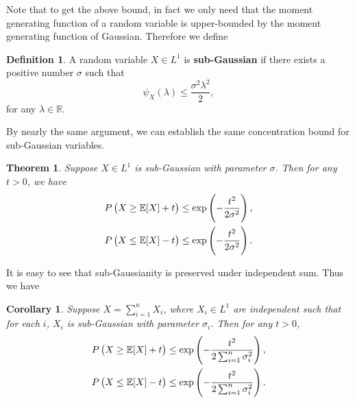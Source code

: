 \documentclass[openany]{book}
\newtheorem{corollary}{Corollary}[chapter]
\newtheorem{theorem}{Theorem}[chapter]
\theoremstyle{definition}
\newtheorem{definition}{Definition}[chapter]
\theoremstyle{remark}
\begin{document}
Note that to get the above bound, in fact we only need that the moment generating function of a random variable is upper-bounded by the moment generating function of Gaussian. Therefore we define
\begin{definition}\label{def:subGaussian}
    A random variable $X\in L^1$ is \textbf{sub-Gaussian} if there exists a positive number $\sigma$ such that
    \begin{equation*}
        \psi_X(\lambda)\le \frac{\sigma^2\lambda^2}{2},
    \end{equation*}
    for any $\lambda\in \mathbb{R}$.
\end{definition}
By nearly the same argument, we can establish the same concentration bound for sub-Gaussian variables.
\begin{theorem}
    Suppose $X\in L^1$ is sub-Gaussian with parameter $\sigma$. Then for any $t>0$, we have
    \begin{align*}
        P\del{X\ge \mathbb{E}[X]+t} & \le\exp\left(-\frac{t^2}{2\sigma^2}\right), \\
        P\del{X\le \mathbb{E}[X]-t} & \le\exp\left(-\frac{t^2}{2\sigma^2}\right).
    \end{align*}
\end{theorem}
It is easy to see that sub-Gaussianity is preserved under independent sum. Thus we have
\begin{corollary}
    Suppose $X=\sum_{i=1}^{n}X_i$, where $X_i\in L^1$ are independent such that for each $i$, $X_i$ is sub-Gaussian with parameter $\sigma_i$. Then for any $t>0$,
    \begin{align*}
        P\del{X\ge \mathbb{E}[X]+t} & \le\exp\left(-\frac{t^2}{2 \sum_{i=1}^{n}\sigma_i^2}\right), \\
        P\del{X\le \mathbb{E}[X]-t} & \le\exp\left(-\frac{t^2}{2 \sum_{i=1}^{n}\sigma_i^2}\right).
    \end{align*}
\end{corollary}
\end{document}
